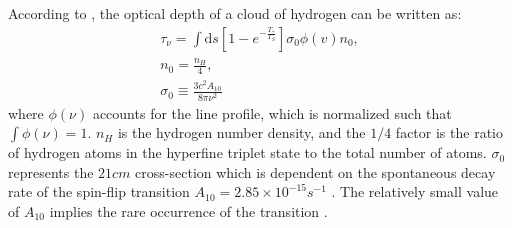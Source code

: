 \documentclass[12pt, TexShade, letterpaper]{report}
\begin{document}

According to \cite{21century, low_frequency}, the optical depth of a cloud of hydrogen can be written as:
\begin{gather}
    \tau_\nu=\int \mathrm{d} s\left[1- e^{ -\frac {T_*}{ T_S}}\right] \sigma_0 \phi(v) n_0 ,\\
    n_0 =\frac{n_H}{4},\\
    \sigma_0 \equiv \frac{3c^2 A_{10}}{8\pi \nu^2}
\end{gather}
where $\phi(\nu)$ accounts for the line profile, which is normalized such that $\int \phi \left(\nu\right) =1$. $n_H$ is the hydrogen number density, and the $1/4$ factor is the ratio of hydrogen atoms in the hyperfine triplet state to the total number of atoms. $\sigma_0$ represents the $21cm$ cross-section which is dependent on the spontaneous decay rate of the spin-flip transition $A_{10} = 2.85 \times 10^{-15} s^{-1}$ \cite{21century, low_frequency}. The relatively small value of $A_{10}$ implies the rare occurrence of the transition \cite{kit_thesis}. 
\end{document}
